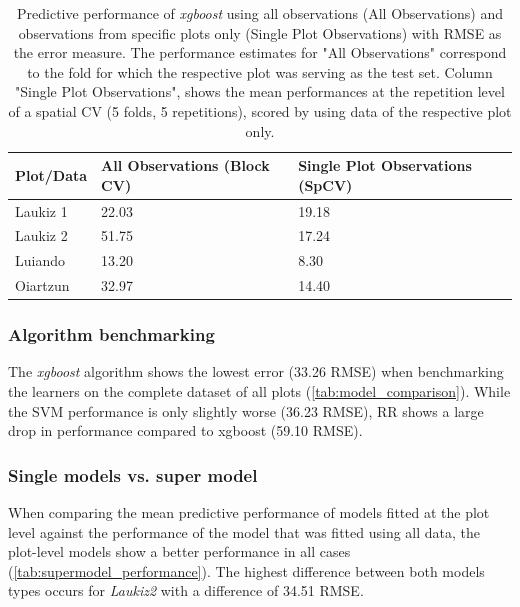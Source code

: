 \documentclass[review]{elsarticle}
\begin{document}
\begin{table}[t!]
\centering
\caption[t]{Predictive performance of \textit{xgboost} using all observations (All Observations) and observations from specific plots only (Single Plot Observations) with \ac{RMSE} as the error measure. The performance estimates for "All Observations" correspond to the fold for which the respective plot was serving as the test set. Column "Single Plot Observations", shows the mean performances at the repetition level of a spatial CV (5 folds, 5 repetitions), scored by using data of the respective plot only.}
\begingroup\footnotesize
\begin{tabular}{lll}
	\\
	Plot/Data & All Observations (Block CV) & Single Plot Observations (SpCV) \\
	\hline
	Laukiz 1  & 22.03                       & 19.18                           \\
	Laukiz 2  & 51.75                       & 17.24                           \\
	Luiando   & 13.20                       & 8.30                            \\
	Oiartzun  & 32.97                       & 14.40                           \\
	\bottomrule
\end{tabular}
\endgroup
\label{tab:supermodel_performance}
\end{table}

\subsubsection{Algorithm benchmarking}

The \textit{xgboost} algorithm shows the lowest error (33.26 RMSE) when benchmarking the learners on the complete dataset of all plots (\autoref{tab:model_comparison}).
While the SVM performance is only slightly worse (36.23 RMSE), RR shows a large drop in performance compared to xgboost (59.10 RMSE).

\subsubsection{Single models vs. super model}

When comparing the mean predictive performance of models fitted at the plot level against the performance of the model that was fitted using all data, the plot-level models show a better performance in all cases (\autoref{tab:supermodel_performance}).
The highest difference between both models types occurs for \textit{Laukiz2} with a difference of 34.51 RMSE.
\end{document}
